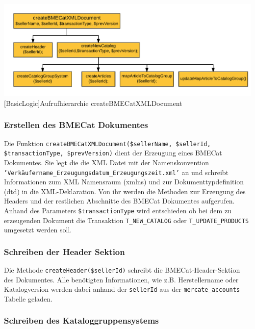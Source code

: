 	\begin{minipage}{\linewidth}
		\vspace{1em}
		\centering
		\includegraphics[width=0.7 \linewidth]{img/createBMECatHierarchie}
		[BasicLogic]{Aufrufhierarchie createBMECatXMLDocument}
		\vspace{1em}
	\end{minipage}
	
	
	
	
	
	\subsubsection{Erstellen des BMECat Dokumentes}
	
	Die Funktion \texttt{createBMECatXMLDocument(\$sellerName, \$sellerId, \$transactionType, \$prevVersion)} dient der Erzeugung eines BMECat Dokumentes. Sie legt die die XML Datei mit der Namenskonvention \texttt{'Verkäufername\_Erzeugungsdatum\_Erzeugungszeit.xml'} an und schreibt Informationen zum XML Namensraum (xmlns) und zur Dokumenttypdefinition (dtd) in die XML-Deklaration. Von ihr werden die Methoden zur Erzeugung des Headers und der restlichen Abschnitte des BMECat Dokumentes aufgerufen.
	Anhand des Parameters \texttt{\$transactionType} wird entschieden ob bei dem zu erzeugenden Dokument die Transaktion \texttt{T\_NEW\_CATALOG} oder \texttt{T\_UPDATE\_PRODUCTS} umgesetzt werden soll.
	
	\subsubsection{Schreiben der Header Sektion}

	Die Methode \texttt{createHeader(\$sellerId)} schreibt die BMECat-Header-Sektion des Dokumentes. Alle benötigten Informationen, wie z.B. Herstellername oder Katalogversion werden dabei anhand der \texttt{sellerId} aus der \texttt{mercate\_accounts} Tabelle geladen.
	
	\subsubsection{Schreiben des Kataloggruppensystems}
	
